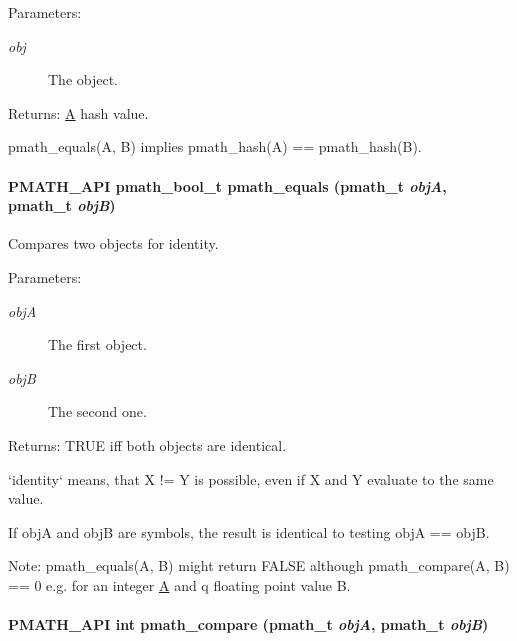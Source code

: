 \begin{Desc}
\item[Parameters:]
\begin{description}
\item[{\em obj}]The object. \end{description}
\end{Desc}
\begin{Desc}
\item[Returns:]\hyperlink{class_a}{A} hash value.\end{Desc}
pmath\_\-equals(A, B) implies pmath\_\-hash(A) == pmath\_\-hash(B). \hypertarget{group__objects_g6475af7f7c85777392e38c570ac07892}{
\paragraph[{pmath\_\-equals}]{\setlength{\rightskip}{0pt plus 5cm}PMATH\_\-API {\bf pmath\_\-bool\_\-t} pmath\_\-equals ({\bf pmath\_\-t} {\em objA}, \/  {\bf pmath\_\-t} {\em objB})}\hfill}
\label{group__objects_g6475af7f7c85777392e38c570ac07892}


Compares two objects for identity. 

\begin{Desc}
\item[Parameters:]
\begin{description}
\item[{\em objA}]The first object. \item[{\em objB}]The second one. \end{description}
\end{Desc}
\begin{Desc}
\item[Returns:]TRUE iff both objects are identical.\end{Desc}
`identity` means, that X != Y is possible, even if X and Y evaluate to the same value.

If objA and objB are symbols, the result is identical to testing objA == objB.

\begin{Desc}
\item[Note:]pmath\_\-equals(A, B) might return FALSE although pmath\_\-compare(A, B) == 0 e.g. for an integer \hyperlink{class_a}{A} and q floating point value B. \end{Desc}
\hypertarget{group__objects_gc57589e08f5b3eed28e724c646503735}{
\paragraph[{pmath\_\-compare}]{\setlength{\rightskip}{0pt plus 5cm}PMATH\_\-API int pmath\_\-compare ({\bf pmath\_\-t} {\em objA}, \/  {\bf pmath\_\-t} {\em objB})}\hfill}
\label{group__objects_gc57589e08f5b3eed28e724c646503735}


